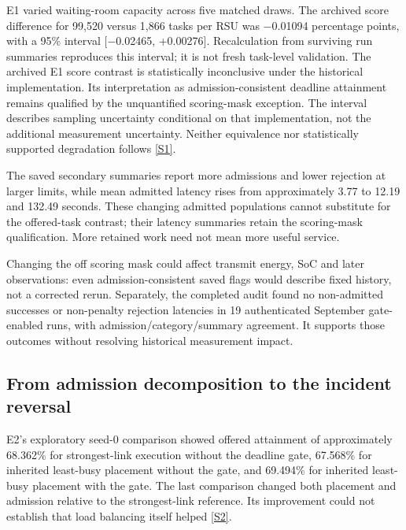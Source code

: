 \documentclass[11pt,a4paper]{article}
\begin{document}
E1 varied waiting-room capacity across five matched draws. The archived score difference for 99,520 versus 1,866 tasks per RSU was \ensuremath{-}0.01094 percentage points, with a 95\% interval [\ensuremath{-}0.02465, +0.00276]. Recalculation from surviving run summaries reproduces this interval; it is not fresh task-level validation. The archived E1 score contrast is statistically inconclusive under the historical implementation. Its interpretation as admission-consistent deadline attainment remains qualified by the unquantified scoring-mask exception. The interval describes sampling uncertainty conditional on that implementation, not the additional measurement uncertainty. Neither equivalence nor statistically supported degradation follows \hyperref[source-s1]{[S1]}.

The saved secondary summaries report more admissions and lower rejection at larger limits, while mean admitted latency rises from approximately 3.77 to 12.19 and 132.49 seconds. These changing admitted populations cannot substitute for the offered-task contrast; their latency summaries retain the scoring-mask qualification. More retained work need not mean more useful service.

Changing the off scoring mask could affect transmit energy, SoC and later observations: even admission-consistent saved flags would describe fixed history, not a corrected rerun. Separately, the completed audit found no non-admitted successes or non-penalty rejection latencies in 19 authenticated September gate-enabled runs, with admission/category/summary agreement. It supports those outcomes without resolving historical measurement impact.

\subsection{From admission decomposition to the incident reversal}\label{sec:3.2}

E2's exploratory seed-0 comparison showed offered attainment of approximately 68.362\% for strongest-link execution without the deadline gate, 67.568\% for inherited least-busy placement without the gate, and 69.494\% for inherited least-busy placement with the gate. The last comparison changed both placement and admission relative to the strongest-link reference. Its improvement could not establish that load balancing itself helped \hyperref[source-s2]{[S2]}.
\end{document}
